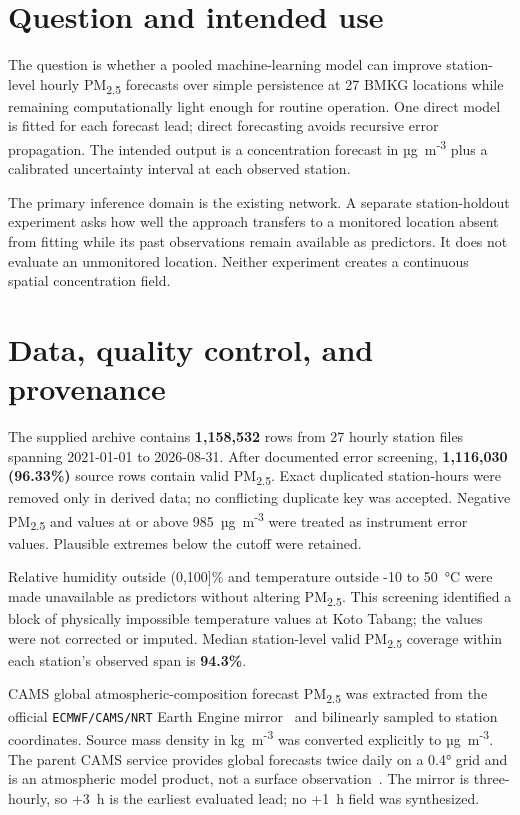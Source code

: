 \documentclass[11pt,a4paper]{article}
\begin{document}
\section{Question and intended use}
The question is whether a pooled machine-learning model can improve station-level hourly PM\textsubscript{2.5} forecasts over simple persistence at 27 BMKG locations while remaining computationally light enough for routine operation. One direct model is fitted for each forecast lead; direct forecasting avoids recursive error propagation. The intended output is a concentration forecast in µg~m\textsuperscript{-3} plus a calibrated uncertainty interval at each observed station.

The primary inference domain is the existing network. A separate station-holdout experiment asks how well the approach transfers to a monitored location absent from fitting while its past observations remain available as predictors. It does not evaluate an unmonitored location. Neither experiment creates a continuous spatial concentration field.

\section{Data, quality control, and provenance}
The supplied archive contains \textbf{1,158,532} rows from 27 hourly station files spanning 2021-01-01 to 2026-08-31. After documented error screening, \textbf{1,116,030 (96.33\%)} source rows contain valid PM\textsubscript{2.5}. Exact duplicated station-hours were removed only in derived data; no conflicting duplicate key was accepted. Negative PM\textsubscript{2.5} and values at or above 985~µg~m\textsuperscript{-3} were treated as instrument error values. Plausible extremes below the cutoff were retained.

Relative humidity outside (0,100]\% and temperature outside -10 to 50~°C were made unavailable as predictors without altering PM\textsubscript{2.5}. This screening identified a block of physically impossible temperature values at Koto Tabang; the values were not corrected or imputed. Median station-level valid PM\textsubscript{2.5} coverage within each station's observed span is \textbf{94.3\%}.

CAMS global atmospheric-composition forecast PM\textsubscript{2.5} was extracted from the official \texttt{ECMWF/CAMS/NRT} Earth Engine mirror~\cite{camsgee} and bilinearly sampled to station coordinates. Source mass density in kg~m\textsuperscript{-3} was converted explicitly to µg~m\textsuperscript{-3}. The parent CAMS service provides global forecasts twice daily on a 0.4° grid and is an atmospheric model product, not a surface observation~\cite{cams}. The mirror is three-hourly, so +3~h is the earliest evaluated lead; no +1~h field was synthesized.
\end{document}
